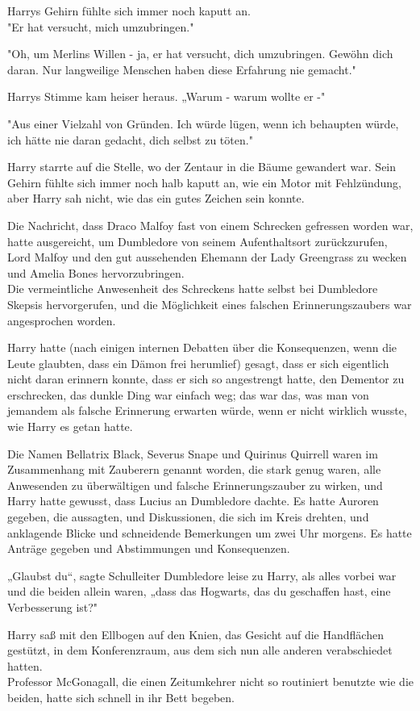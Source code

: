 {Harrys Gehirn fühlte sich immer noch kaputt an.\\ "Er hat versucht, mich umzubringen."

"Oh, um Merlins Willen - ja, er hat versucht, dich umzubringen. Gewöhn dich daran. Nur langweilige Menschen haben diese Erfahrung nie gemacht."

Harrys Stimme kam heiser heraus. „Warum - warum wollte er -"

"Aus einer Vielzahl von Gründen. Ich würde lügen, wenn ich behaupten würde, ich hätte nie daran gedacht, dich selbst zu töten."

Harry starrte auf die Stelle, wo der Zentaur in die Bäume gewandert war. Sein Gehirn fühlte sich immer noch halb kaputt an, wie ein Motor mit Fehlzündung, aber Harry sah nicht, wie das ein gutes Zeichen sein konnte.

Die Nachricht, dass Draco Malfoy fast von einem Schrecken gefressen worden war, hatte ausgereicht, um Dumbledore von seinem Aufenthaltsort zurückzurufen, Lord Malfoy und den gut aussehenden Ehemann der Lady Greengrass zu wecken und Amelia Bones hervorzubringen.\\ Die vermeintliche Anwesenheit des Schreckens hatte selbst bei Dumbledore Skepsis hervorgerufen, und die Möglichkeit eines falschen Erinnerungszaubers war angesprochen worden.

Harry hatte (nach einigen internen Debatten über die Konsequenzen, wenn die Leute glaubten, dass ein Dämon frei herumlief) gesagt, dass er sich eigentlich nicht daran erinnern konnte, dass er sich so angestrengt hatte, den Dementor zu erschrecken, das dunkle Ding war einfach weg; das war das, was man von jemandem als falsche Erinnerung erwarten würde, wenn er nicht wirklich wusste, wie Harry es getan hatte.

Die Namen Bellatrix Black, Severus Snape und Quirinus Quirrell waren im Zusammenhang mit Zauberern genannt worden, die stark genug waren, alle Anwesenden zu überwältigen und falsche Erinnerungszauber zu wirken, und Harry hatte gewusst, dass Lucius an Dumbledore dachte. Es hatte Auroren gegeben, die aussagten, und Diskussionen, die sich im Kreis drehten, und anklagende Blicke und schneidende Bemerkungen um zwei Uhr morgens. Es hatte Anträge gegeben und Abstimmungen und Konsequenzen.

„Glaubst du“, sagte Schulleiter Dumbledore leise zu Harry, als alles vorbei war und die beiden allein waren, „dass das Hogwarts, das du geschaffen hast, eine Verbesserung ist?"

Harry saß mit den Ellbogen auf den Knien, das Gesicht auf die Handflächen gestützt, in dem Konferenzraum, aus dem sich nun alle anderen verabschiedet hatten.\\ Professor McGonagall, die einen Zeitumkehrer nicht so routiniert benutzte wie die beiden, hatte sich schnell in ihr Bett begeben.

}
